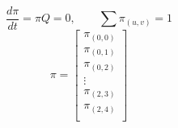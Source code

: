 \begin{frame}
\begin{multicols}{2}
        \tiny
        \vspace*{-0.9cm}
        \begin{equation*}
            \frac{d \pi}{dt} = \pi Q = 0, \qquad \sum \pi_{(u,v)} = 1
        \end{equation*}
        \begin{equation*}
            \pi =
            \begin{bmatrix}
                \pi_{(0,0)} \\
                \pi_{(0,1)} \\
                \pi_{(0,2)} \\
                \vdots \\
                \pi_{(2,3)} \\
                \pi_{(2,4)} \\
            \end{bmatrix} 
        \end{equation*}
        \columnbreak
    \end{multicols}

\end{frame}



